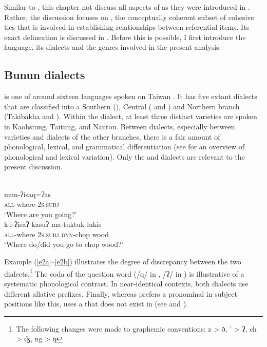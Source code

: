 \documentclass[output=paper
,modfonts
,nonflat]{langsci/langscibook}
\begin{document}
Similar to \citet{Malah2016}, this chapter not discuss all aspects of  as they were introduced in \citet{Halliday1976}. Rather, the discussion focuses on , the conceptually coherent subset of cohesive ties that is involved in establishing relationships between referential items. Its exact delineation is discussed in . Before this is possible, I first introduce the  language, its dialects and the genres involved in the present analysis.

\subsection{\label{s1.3}Bunun dialects}

 is one of around sixteen  languages spoken on Taiwan \citep{Li2008}. It has five extant dialects that are classified into a Southern (), Central ( and ) and Northern branch (Takibakha and ). Within the  dialect, at least three distinct varieties are spoken in Kaohsiung, Taitung, and Nantou. Between dialects, especially between  varieties and dialects of the other branches, there is a fair amount of phonological, lexical, and grammatical differentiation (see \citealt{Li1988} for an overview of phonological and lexical variation). Only the  and  dialects are relevant to the present discussion. 


\begin{exe}
	\ex\label{e2}
	\begin{xlist}
		\ex\label{e2a} \\
		\gll mun-ʔisaq=ʔas  \\
		\textsc{all}-where-\textsc{2s}.\textsc{subj}\\
		\glt `Where are you going?’
		\ex\label{e2b} \\
		\gll ku-ʔisaʔ  kasuʔ  ma-tuktuk  lukis  \\
		\textsc{all}-where  \textsc{2s}.\textsc{subj}  \textsc{dyn}-chop  wood\\
		\glt `Where do/did you go to chop wood?’
	\end{xlist}
\end{exe}

\noindent
Example (\ref{e2a}--\ref{e2b}) illustrates the degree of discrepancy between the two dialects.\footnote{The following changes were made to graphemic conventions: z > ð, ' > ʔ, ch > ʤ, ng > ŋ} The coda of the question word (/q/ in , /ʔ/ in ) is illustrative of a systematic phonological contrast. In near-identical contexts, both dialects use different allative prefixes. Finally, whereas  prefers a pronominal  in subject positions like this,  uses a  that does not exist in  (see  and ).
\end{document}
